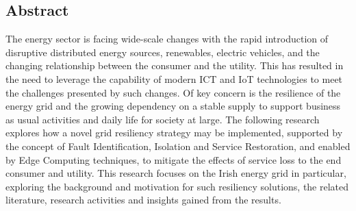 \begin{center}
  \section*{Abstract}
  \label{sec:abstract}
  \thispagestyle{empty}
\end{center}
  The energy sector is facing wide-scale changes with the rapid introduction of disruptive distributed energy sources, renewables, electric vehicles, and the changing
  relationship between the consumer and the utility. This has resulted in the need to leverage the capability of modern ICT and IoT technologies to meet the challenges
  presented by such changes. Of key concern is the resilience of the energy grid and the growing dependency on a stable supply to support business as usual activities and
  daily life for society at large. The following research explores how a novel grid resiliency strategy may be implemented, supported by the concept of Fault Identification, Isolation and
  Service Restoration, and enabled by Edge Computing techniques, to mitigate the effects of service loss to the end consumer and utility.
  This research focuses on the Irish energy grid in particular, exploring the background and motivation for such resiliency solutions, the related literature, research activities and
  insights gained from the results.
